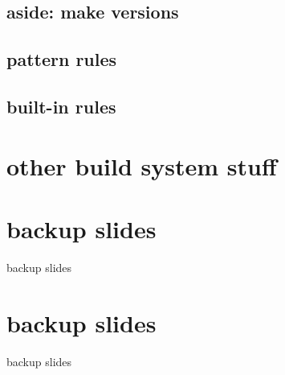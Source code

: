 

\subsection{aside: make versions}



\subsection{pattern rules}



\subsection{built-in rules}



\section{other build system stuff}






\section{backup slides}
\begin{frame}{backup slides}
\end{frame}





\section{backup slides}
\begin{frame}{backup slides}
\end{frame}


